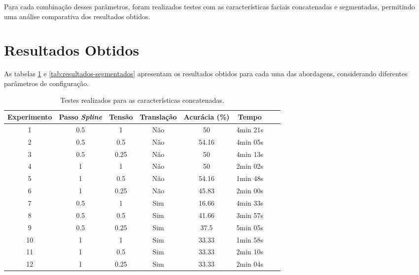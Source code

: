 Para cada combinação desses parâmetros, foram realizados testes com as características faciais concatenadas e segmentadas, permitindo uma análise comparativa dos resultados obtidos.

\section{Resultados Obtidos}

 As tabelas \ref{tab:resultados-concatenados} e \ref{tab:resultados-segmentados} apresentam os resultados obtidos para cada uma das abordagens, considerando diferentes parâmetros de configuração.

\begin{table}[h!]
    \centering
    \caption{Testes realizados para as características concatenadas.}
    \begin{tabular}{|c|c|c|c|c|c|c|c|}
    \hline
    \textbf{Experimento} & \textbf{Passo \textit{Spline}} & \textbf{Tensão} & \textbf{Translação} & \textbf{Acurácia (\%)} & \textbf{Tempo} \\
    \hline
    1 & 0.5 & 1 & Não & 50 & 4min 21s\\
    2 & 0.5 & 0.5 & Não & 54.16 & 4min 05s\\
    3 & 0.5 & 0.25 & Não & 50 & 4min 13s\\

    4 & 1 & 1 & Não & 50 & 2min 02s\\
    5 & 1 & 0.5 & Não & 54.16 & 1min 48s\\
    6 & 1 & 0.25 & Não & 45.83 & 2min 00s\\

    7 & 0.5 & 1 & Sim & 16.66 & 4min 33s \\
    8 & 0.5 & 0.5 & Sim & 41.66 & 3min 57s \\
    9 & 0.5 & 0.25 & Sim & 37.5 & 5min 05s\\
 
    10 & 1 & 1 & Sim & 33.33 & 1min 58s \\
    11 & 1 & 0.5 & Sim & 33.33 & 2min 10s \\
    12 & 1 & 0.25 & Sim & 33.33 & 2min 04s \\
    \hline
    \end{tabular}
    \label{tab:resultados-concatenados}
\end{table}

